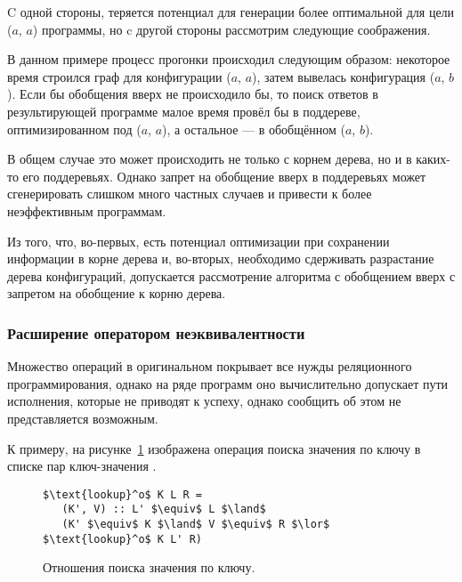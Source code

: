 C одной стороны, теряется потенциал для генерации более оптимальной для цели ($a$, $a$)
программы, но c другой стороны рассмотрим следующие соображения.

В данном примере процесс прогонки происходил следующим образом: некоторое время строился
граф для конфигурации ($a$, $a$), затем вывелась конфигурация ($a$, $b$).
Если бы обобщения вверх не происходило бы, то поиск ответов в результирующей программе
малое время провёл бы в поддереве, оптимизированном под ($a$, $a$), а остальное --- в обобщённом
($a$, $b$).

В общем случае это может происходить не только с корнем дерева, но и в каких-то его поддеревьях.
Однако запрет на обобщение вверх в поддеревьях может сгенерировать слишком много частных случаев
и привести к более неэффективным программам.

Из того, что, во-первых, есть потенциал оптимизации при сохранении информации в корне дерева и,
во-вторых, необходимо сдерживать разрастание дерева конфигураций,
допускается рассмотрение алгоритма с обобщением вверх с запретом на обобщение к корню дерева.


\subsubsection{Расширение \ukanren оператором неэквивалентности}

Множество операций в оригинальном \ukanren покрывает все нужды реляционного программирования,
однако на ряде программ оно вычислительно допускает пути исполнения, которые не приводят
к успеху, однако сообщить об этом не представляется возможным.

К примеру, на рисунке~\ref{fig:lookup} изображена операция поиска значения по ключу
в списке пар ключ-значения .

\begin{figure}[h!]
\begin{lstlisting}
$\text{lookup}^o$ K L R =
   (K', V) :: L' $\equiv$ L $\land$
   (K' $\equiv$ K $\land$ V $\equiv$ R $\lor$ $\text{lookup}^o$ K L' R)
\end{lstlisting}
\caption{Отношения поиска значения по ключу.}
\label{fig:lookup}
\end{figure}

